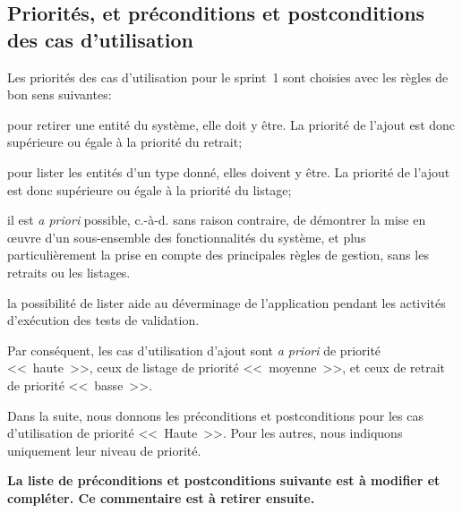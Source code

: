 \documentclass[11pt,article]{article}
\newcommand{\haute}{Haute}
\begin{document}
\newpage

\subsection{Priorités, et préconditions et postconditions des cas d'utilisation}

Les priorités des cas d'utilisation pour le sprint~1 sont choisies
avec les règles de bon sens suivantes:
\begin{compactitem}
\item pour retirer une entité du système, elle doit y être. La
priorité de l'ajout est donc supérieure ou égale à la priorité du
retrait;
\item pour lister les entités d'un type donné, elles doivent y être. La
priorité de l'ajout est donc supérieure ou égale à la priorité du
listage;
\item il est \textit{a priori} possible, c.-à-d. sans raison
contraire, de démontrer la mise en œuvre d'un sous-ensemble des
fonctionnalités du système, et plus particulièrement la prise en
compte des principales règles de gestion, sans les retraits ou les
listages.
\item la possibilité de lister aide au déverminage de l'application
pendant les activités d'exécution des tests de validation.
\end{compactitem}
Par conséquent, les cas d'utilisation d'ajout sont \textit{a priori}
de priorité <<~haute~>>, ceux de listage de priorité <<~moyenne~>>, et
ceux de retrait de priorité <<~basse~>>.

\bigskip

Dans la suite, nous donnons les préconditions et postconditions pour
les cas d'utilisation de priorité <<~\haute~>>. Pour les autres, nous
indiquons uniquement leur niveau de priorité.

\bigskip

{\noindent\color{red}\textbf{La liste de préconditions et
    postconditions suivante est à modifier et compléter. Ce
    commentaire est à retirer ensuite.}}

\bigskip
\end{document}

